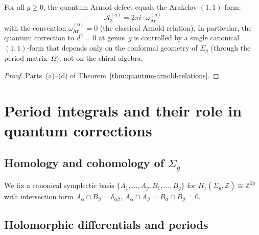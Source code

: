 \begin{corollary}
\label{cor:universal-arakelov-disabled}
For all $g \geq 0$, the quantum Arnold defect equals the Arakelov
$(1,1)$-form:
\begin{equation}\label{eq:universal-arakelov-disabled}
\mathcal{A}_3^{(g)} = 2\pi i \cdot \omega_{\mathrm{Ar}}^{(g)}
\end{equation}
with the convention $\omega_{\mathrm{Ar}}^{(0)} = 0$ (the classical
Arnold relation). In particular, the quantum correction to
$d^2 = 0$ at genus~$g$ is controlled by a single canonical
$(1,1)$-form that depends only on the conformal geometry of
$\Sigma_g$ (through the period matrix~$\Omega$), not on the
chiral algebra.
\end{corollary}

\begin{proof}
Parts~(a)--(d) of Theorem~\ref{thm:quantum-arnold-relations}.
\end{proof}
\fi


\section{Period integrals and their role in quantum corrections}
\label{sec:period-integrals-quantum}

\subsection{\texorpdfstring{Homology and cohomology of $\Sigma_g$}{Homology and cohomology of Sigma-g}}

\begin{convention}\label{conv:topology-genus-g}
We fix a canonical symplectic basis $\{A_1, \ldots, A_g, B_1, \ldots, B_g\}$ for $H_1(\Sigma_g, \mathbb{Z}) \cong \mathbb{Z}^{2g}$ with intersection form $A_\alpha \cap B_\beta = \delta_{\alpha\beta}$, $A_\alpha \cap A_\beta = B_\alpha \cap B_\beta = 0$.
\end{convention}

\subsection{Holomorphic differentials and periods}
\label{sec:holomorphic-forms-genus-g}

